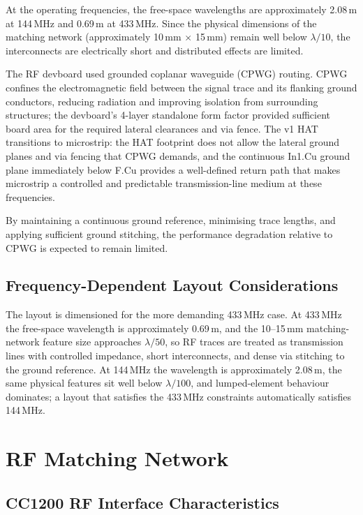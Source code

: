 At the operating frequencies, the free-space wavelengths are approximately 2.08\,m at 144\,MHz and 0.69\,m at 433\,MHz. Since the physical dimensions of the matching network (approximately 10\,mm $\times$ 15\,mm) remain well below $\lambda/10$, the interconnects are electrically short and distributed effects are limited.

The RF devboard used grounded coplanar waveguide (CPWG) routing. CPWG confines the electromagnetic field between the signal trace and its flanking ground conductors, reducing radiation and improving isolation from surrounding structures; the devboard's 4-layer standalone form factor provided sufficient board area for the required lateral clearances and via fence. The v1 HAT transitions to microstrip: the HAT footprint does not allow the lateral ground planes and via fencing that CPWG demands, and the continuous In1.Cu ground plane immediately below F.Cu provides a well-defined return path that makes microstrip a controlled and predictable transmission-line medium at these frequencies.

By maintaining a continuous ground reference, minimising trace lengths, and applying sufficient ground stitching, the performance degradation relative to CPWG is expected to remain limited.

\subsection{Frequency-Dependent Layout Considerations}

The layout is dimensioned for the more demanding 433\,MHz case. At 433\,MHz the free-space wavelength is approximately 0.69\,m, and the 10--15\,mm matching-network feature size approaches $\lambda/50$, so RF traces are treated as transmission lines with controlled impedance, short interconnects, and dense via stitching to the ground reference. At 144\,MHz the wavelength is approximately 2.08\,m, the same physical features sit well below $\lambda/100$, and lumped-element behaviour dominates; a layout that satisfies the 433\,MHz constraints automatically satisfies 144\,MHz.

\section{RF Matching Network}

\subsection{CC1200 RF Interface Characteristics}

